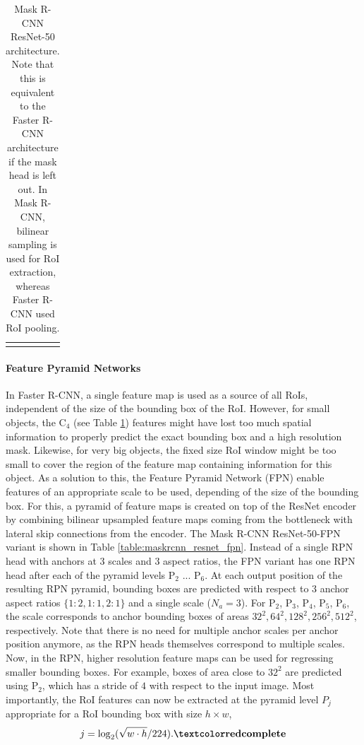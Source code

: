 {\begin{longtable}{llr}
\bottomrule

\caption {
Mask R-CNN \cite{MaskRCNN} ResNet-50 \cite{ResNet} architecture.
Note that this is equivalent to the Faster R-CNN architecture if the mask
head is left out. In Mask R-CNN, bilinear sampling is used for RoI extraction,
whereas Faster R-CNN used RoI pooling.
}
\label{table:maskrcnn_resnet}
\end{longtable}
}

\paragraph{Feature Pyramid Networks}
In Faster R-CNN, a single feature map is used as a source of all RoIs, independent
of the size of the bounding box of the RoI.
However, for small objects, the C$_4$ (see Table \ref{table:maskrcnn_resnet}) features
might have lost too much spatial information to properly predict the exact bounding
box and a high resolution mask. Likewise, for very big objects, the fixed size
RoI window might be too small to cover the region of the feature map containing
information for this object.
As a solution to this, the Feature Pyramid Network (FPN) \cite{FPN} enable features
of an appropriate scale to be used, depending of the size of the bounding box.
For this, a pyramid of feature maps is created on top of the ResNet \cite{ResNet}
encoder by combining bilinear upsampled feature maps coming from the bottleneck
with lateral skip connections from the encoder.
The Mask R-CNN ResNet-50-FPN variant is shown in Table \ref{table:maskrcnn_resnet_fpn}.
Instead of a single RPN head with anchors at 3 scales and 3 aspect ratios,
the FPN variant has one RPN head after each of the pyramid levels P$_2$ ... P$_6$.
At each output position of the resulting RPN pyramid, bounding boxes are predicted
with respect to 3 anchor aspect ratios $\{1:2, 1:1, 2:1\}$ and a single scale ($N_a = 3$).
For P$_2$, P$_3$, P$_4$, P$_5$, P$_6$,
the scale corresponds to anchor bounding boxes of areas $32^2, 64^2, 128^2, 256^2, 512^2$,
respectively.
Note that there is no need for multiple anchor scales per anchor position anymore,
as the RPN heads themselves correspond to multiple scales.
Now, in the RPN, higher resolution feature maps can be used for regressing smaller
bounding boxes. For example, boxes of area close to $32^2$ are predicted using P$_2$,
which has a stride of $4$ with respect to the input image.
Most importantly, the RoI features can now be extracted at the pyramid level $P_j$ appropriate for a
RoI bounding box with size $h \times w$,
\begin{equation}
j = \log_2(\sqrt{w \cdot h} / 224). \todo{complete}
\label{eq:level_assignment}
\end{equation}


